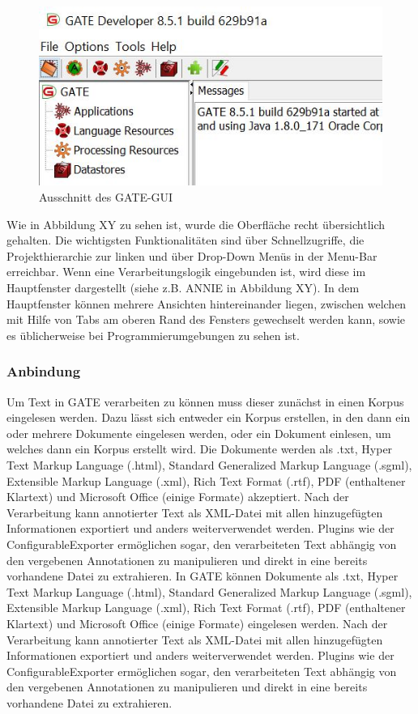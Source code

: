 \documentclass[12pt]{report}
\begin{document}
\begin{figure}[h!]
\begin{center}
\includegraphics[scale=0.8]{GATE_Bilder/GUI-Ausschnitt.jpg}
\caption{Ausschnitt des GATE-GUI}
\end{center}
\end{figure}

Wie in Abbildung XY zu sehen ist, wurde die Oberfläche recht übersichtlich gehalten. Die wichtigsten Funktionalitäten sind über Schnellzugriffe, die Projekthierarchie zur linken und über Drop-Down Menüs in der Menu-Bar erreichbar. Wenn eine Verarbeitungslogik eingebunden ist, wird diese im Hauptfenster dargestellt (siehe z.B. ANNIE in Abbildung XY). In dem Hauptfenster können mehrere Ansichten hintereinander liegen, zwischen welchen mit Hilfe von Tabs am oberen Rand des Fensters gewechselt werden kann, sowie es üblicherweise bei Programmierumgebungen zu sehen ist. 

\subsubsection{Anbindung}

Um Text in GATE verarbeiten zu können muss dieser zunächst in einen Korpus eingelesen werden. Dazu lässt sich entweder ein Korpus erstellen, in den dann ein oder mehrere Dokumente eingelesen werden, oder ein Dokument einlesen, um welches dann ein Korpus erstellt wird. Die Dokumente werden als .txt, Hyper Text Markup Language (.html), Standard Generalized Markup Language (.sgml), Extensible Markup Language (.xml), Rich Text Format (.rtf), PDF (enthaltener Klartext) und Microsoft Office (einige Formate) akzeptiert.
Nach der Verarbeitung kann annotierter Text als XML-Datei mit allen hinzugefügten Informationen exportiert und anders weiterverwendet werden. Plugins wie der ConfigurableExporter ermöglichen sogar, den verarbeiteten Text abhängig von den vergebenen Annotationen zu manipulieren und direkt in eine bereits vorhandene Datei zu extrahieren. 
In GATE können Dokumente als .txt, Hyper Text Markup Language (.html), Standard Generalized Markup Language (.sgml), Extensible Markup Language (.xml), Rich Text Format (.rtf), PDF (enthaltener Klartext) und Microsoft Office (einige Formate) eingelesen werden.
Nach der Verarbeitung kann annotierter Text als XML-Datei mit allen hinzugefügten Informationen exportiert und anders weiterverwendet werden. Plugins wie der ConfigurableExporter ermöglichen sogar, den verarbeiteten Text abhängig von den vergebenen Annotationen zu manipulieren und direkt in eine bereits vorhandene Datei zu extrahieren.\\
\end{document}
